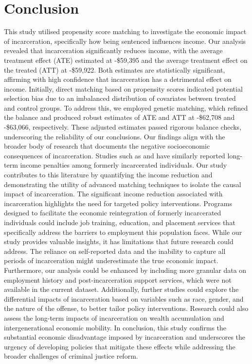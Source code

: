 \documentclass{article}[12pt]
\begin{document}
\section{Conclusion} %
This study utilised propensity score matching to investigate the economic impact of incarceration, specifically how being sentenced influences income. Our analysis revealed that incarceration significantly reduces income, with the average treatment effect (ATE) estimated at -\$59,395 and the average treatment effect on the treated (ATT) at -\$59,922. Both estimates are statistically significant, affirming with high confidence that incarceration has a detrimental effect on income.
Initially, direct matching based on propensity scores indicated potential selection bias due to an imbalanced distribution of covariates between treated and control groups. To address this, we employed genetic matching, which refined the balance and produced robust estimates of ATE and ATT at -\$62,708 and -\$63,066, respectively. These adjusted estimates passed rigorous balance checks, underscoring the reliability of our conclusions.
Our findings align with the broader body of research that documents the negative socioeconomic consequences of incarceration. Studies such as \cite{western2000effects} and \cite{pager2003mark} have similarly reported long-term income penalties among formerly incarcerated individuals. Our study contributes to this literature by quantifying the income reduction and demonstrating the utility of advanced matching techniques to isolate the causal impact of incarceration. The significant income reduction associated with incarceration highlights the need for targeted policy interventions. Programs designed to facilitate the economic reintegration of formerly incarcerated individuals could include job training, education, and placement services that specifically address the barriers to employment this population faces. While our study provides valuable insights, it has limitations that future research could address. The reliance on self-reported data and the inability to capture all periods of incarceration might underestimate the true economic impact. Furthermore, our analysis could be enhanced by including more granular data on employment history and post-incarceration support services, which were not available in the current dataset. Additionally, further studies could explore the differential impacts of incarceration based on variables such as race, gender, and the nature of the offense, to better tailor policy interventions. Research could also assess the long-term impacts of incarceration on wealth accumulation and intergenerational economic mobility.
In conclusion, this study confirms the substantial economic disadvantage imposed by incarceration and underscores the urgency of developing policies that mitigate these effects while addressing the broader challenges of criminal justice reform.
 \par



\end{document}
